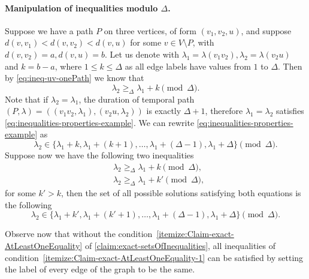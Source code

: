 \documentclass[11pt,a4paper]{article}
\theoremstyle{remark}
\theoremstyle{definition}
\begin{document}
    \paragraph{Manipulation of inequalities modulo $\Delta$.}
    Suppose we have a path $P$ on three vertices, of form $(v_1, v_2, u)$,
    and suppose $d(v,v_1) < d(v,v_2) < d(v,u)$ for some $v \in V \setminus P$, with $d(v,v_2) = a, d(v,u)=b$. 
    Let us denote with $\lambda_1 = \lambda(v_1 v_2), \lambda_2 = \lambda(v_2 u)$ and $k = b-a$, where $1 \leq k \leq \Delta$ as all edge labels have values from $1$ to $\Delta$.
    Then by \cref{eq:ineq-uv-onePath} we know that 
    \begin{equation}\label{eq:inequalities-properties-example}
        \lambda_2 \geq_\Delta \lambda_1 + k \pmod \Delta.
    \end{equation}
    Note that if $\lambda_2 = \lambda_1$, the duration of temporal path $(P, \lambda) = ((v_1v_2, \lambda_1), (v_2u, \lambda_2))$ is exactly $\Delta+1$,
    therefore $\lambda_1 = \lambda_2$ satisfies \cref{eq:inequalities-properties-example}.
    We can rewrite \cref{eq:inequalities-properties-example} as
    \begin{equation*}
        \lambda_2 \in 
        \{
        \lambda_1 + k, \lambda_1 + (k + 1), \dots , \lambda_1 + (\Delta - 1), \lambda_1 + \Delta 
        \} \pmod \Delta.
    \end{equation*}
    Suppose now we have the following two inequalities
    \begin{align*}
        & \lambda_2 \geq_\Delta \lambda_1 + k \pmod \Delta, \\
        & \lambda_2 \geq_\Delta \lambda_1 + k' \pmod \Delta,
    \end{align*}
    for some $k' > k$, then the set of all possible solutions satisfying both equations is the following
        \begin{equation*}
        \lambda_2 \in 
        \{
        \lambda_1 + k', \lambda_1 + (k' + 1), \dots , \lambda_1 + (\Delta - 1), \lambda_1 + \Delta 
        \} \pmod \Delta.
    \end{equation*}
    
    Observe now that without the condition~\ref{itemize:Claim-exact-AtLeastOneEquality} of \cref{claim:exact-setsOfInequalities}, all inequalities of condition~\ref{itemize:Claim-exact-AtLeastOneEquality-1} can be satisfied by setting the label of every edge of the graph to be the same.
    
\end{document}
